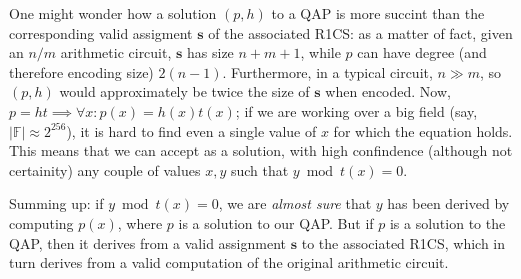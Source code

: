 \noindent One might wonder how a solution \((p, h)\) to a QAP is more succint than the
corresponding valid assigment \(\bm{s}\) of the associated R1CS\@: as a matter of fact, given an
\(n/m\) arithmetic circuit, \(\bm{s}\) has size \(n+m+1\), while \(p\) can have degree 
(and therefore encoding size) \(2(n-1)\).
Furthermore, in a typical circuit, \(n \gg m\), so \((p, h)\) would approximately be twice the size 
of \(\bm{s}\) when encoded.
Now, \(p = ht \implies \forall x\colon p(x) = h(x)t(x)\); if we are working over a big field 
(say, \(|\mathbb{F}| \approx 2^{256}\)), it is hard to find even a single value of \(x\) for which
the equation holds.
This means that we can accept as a solution, with high confindence (although not certainity)
any couple of values \(x, y\) such that \(y \bmod t(x) = 0\). 

Summing up: if \(y \bmod t(x) = 0\), we are \emph{almost sure} that \(y\) has been derived by 
computing \(p(x)\), where \(p\) is a solution to our QAP\@.
But if \(p\) is a solution to the QAP, then it derives from a valid assignment \(\bm{s}\) to the 
associated R1CS, which in turn derives from a valid computation of the original arithmetic circuit.

